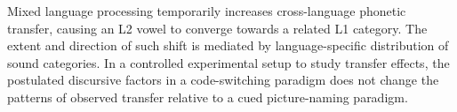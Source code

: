 \documentclass[charis,linguex]{glossa}
\begin{document}
Mixed language processing temporarily increases cross-language phonetic transfer, causing an L2 vowel to converge towards a related L1 category. The extent and direction of such shift is mediated by language-specific distribution of sound categories. In a controlled experimental setup to study transfer effects, the postulated discursive factors in a code-switching paradigm does not change the patterns of observed transfer relative to a cued picture-naming paradigm.



\end{document}
